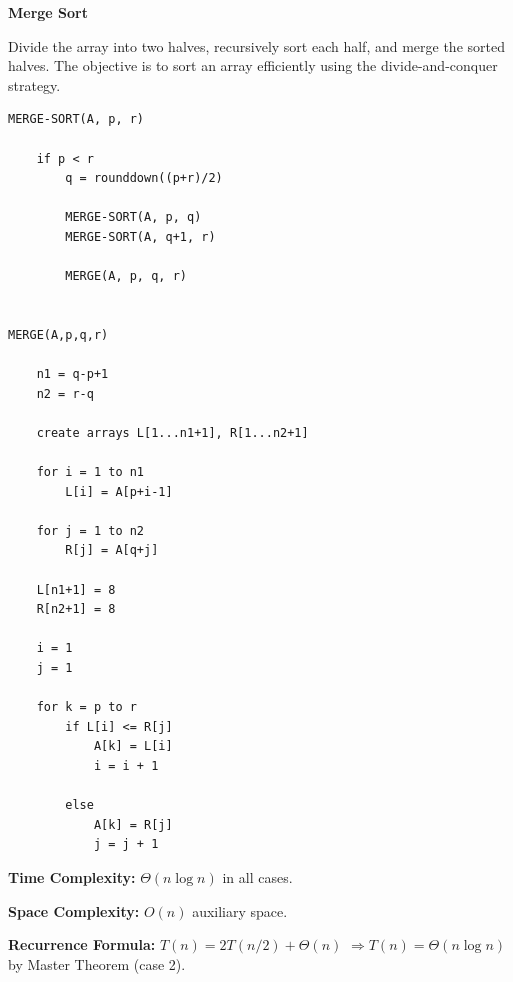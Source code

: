 \documentclass[a4paper,12pt]{article}
\begin{document}
\begin{tcolorbox}[
    colback=gray!30,
    colframe=black,
    boxrule=1pt,
    arc=0mm
]

\begin{tcolorbox}[
    colback=gray!10,
    colframe=black,
    arc=0mm
]
\centering
{\Huge\bfseries Merge Sort}
\end{tcolorbox}

\begin{tcolorbox}[
    colback=gray!10,
    colframe=black,
    arc=0mm
]
\small
Divide the array into two halves, recursively sort each half, and merge the sorted halves.
The objective is to sort an array efficiently using the divide-and-conquer strategy.
\end{tcolorbox}

\begin{tcolorbox}[
    colback=black!5,
    colframe=black,
    arc=0mm,
    title=Pseudo-code
]
\tiny
\begin{lstlisting}
MERGE-SORT(A, p, r)

    if p < r
        q = rounddown((p+r)/2)

        MERGE-SORT(A, p, q)
        MERGE-SORT(A, q+1, r)

        MERGE(A, p, q, r)


MERGE(A,p,q,r)

    n1 = q-p+1
    n2 = r-q

    create arrays L[1...n1+1], R[1...n2+1]

    for i = 1 to n1
        L[i] = A[p+i-1]

    for j = 1 to n2
        R[j] = A[q+j]

    L[n1+1] = 8
    R[n2+1] = 8

    i = 1
    j = 1

    for k = p to r
        if L[i] <= R[j]
            A[k] = L[i]
            i = i + 1

        else
            A[k] = R[j]
            j = j + 1
\end{lstlisting}
\end{tcolorbox}

\begin{tcolorbox}[
    colback=cyan!20,
    colframe=black,
    arc=0mm
]
\small
\textbf{Time Complexity:} $\Theta(n \log n)$ in all cases.
\end{tcolorbox}

\begin{tcolorbox}[
    colback=violet!20,
    colframe=black,
    arc=0mm
]
\small
\textbf{Space Complexity:} $O(n)$ auxiliary space.
\end{tcolorbox}

\begin{tcolorbox}[
    colback=pink!20,
    colframe=black,
    arc=0mm
]
\small
\textbf{Recurrence Formula:}
$T(n)=2T(n/2)+\Theta(n)$
$\Rightarrow T(n)=\Theta(n\log n)$ by Master Theorem (case 2).
\end{tcolorbox}

\end{tcolorbox}
\end{document}

